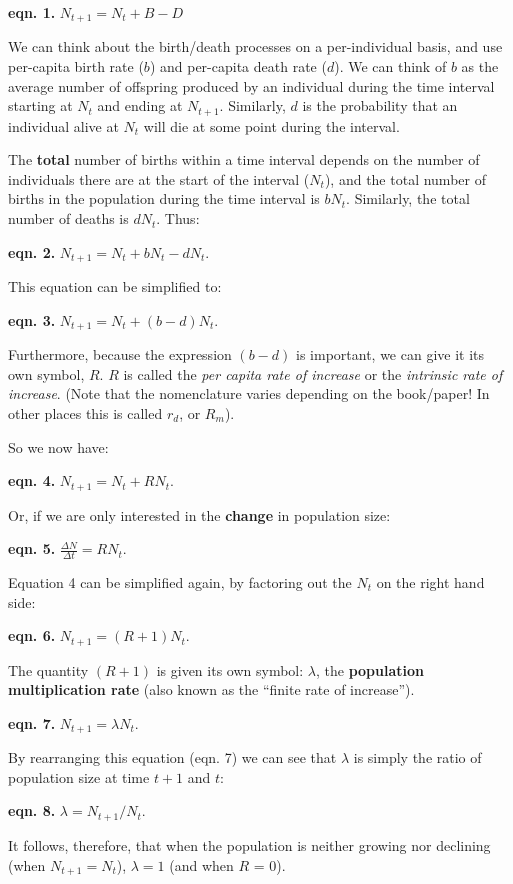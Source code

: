 \documentclass[
  a4paper]{book}
\begin{document}
\textbf{eqn. 1.} \(N_{t+1} = N_t + B - D\)

We can think about the birth/death processes on a per-individual basis, and use per-capita birth rate (\(b\)) and per-capita death rate (\(d\)). We can think of \(b\) as the average number of offspring produced by an individual during the time interval starting at \(N_t\) and ending at \(N_{t+1}\). Similarly, \(d\) is the probability that an individual alive at \(N_t\) will die at some point during the interval.

The \textbf{total} number of births within a time interval depends on the number of individuals there are at the start of the interval (\(N_t\)), and the total number of births in the population during the time interval is \(bN_t\). Similarly, the total number of deaths is \(dN_t\). Thus:

\textbf{eqn. 2.} \(N_{t+1} = N_t + bN_t - dN_t\).

This equation can be simplified to:

\textbf{eqn. 3.} \(N_{t+1} = N_t + (b-d)N_t\).

Furthermore, because the expression \((b-d)\) is important, we can give it its own symbol, \(R\). \(R\) is called the \emph{per capita rate of increase} or the \emph{intrinsic rate of increase}. (Note that the nomenclature varies depending on the book/paper! In other places this is called \(r_d\), or \(R_m\)).

So we now have:

\textbf{eqn. 4.} \(N_{t+1} = N_t + RN_t\).

Or, if we are only interested in the \textbf{change} in population size:

\textbf{eqn. 5.} \(\frac{\Delta N}{\Delta t} = RN_t\).

Equation 4 can be simplified again, by factoring out the \(N_t\) on the right hand side:

\textbf{eqn. 6.} \(N_{t+1} = (R + 1)N_t\).

The quantity \((R+1)\) is given its own symbol: \(\lambda\), the \textbf{population multiplication rate} (also known as the ``finite rate of increase'').

\textbf{eqn. 7.} \(N_{t+1} = \lambda N_t\).

By rearranging this equation (eqn. 7) we can see that \(\lambda\) is simply the ratio of population size at time \(t+1\) and \(t\):

\textbf{eqn. 8.} \(\lambda = N_{t+1}/N_t\).

It follows, therefore, that when the population is neither growing nor declining (when \(N_{t+1}=N_t\)), \(\lambda = 1\) (and when \(R\) = 0).
\end{document}
